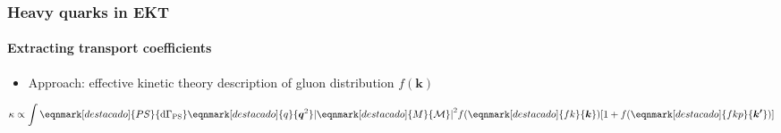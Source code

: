 \documentclass[aspectratio=169,11pt,usenames,dvipsnames]{beamer}
\begin{document}



\begin{frame}
    \frametitle{Heavy quarks in EKT}
    \framesubtitle{Extracting transport coefficients}
        \begin{itemize}
            \item \begin{center}{{\color{ming}Approach}: {\color{ming}effective kinetic theory} description of gluon distribution $f(\boldsymbol{k})$} \end{center}
        \end{itemize} 
        \vspace{1cm}
        \renewcommand{\eqnhighlightheight}{\vphantom{x}}
        \begin{equation*}
            \kappa\propto \int\eqnmark[destacado]{PS}{\mathrm{d}\Gamma_{\mathrm{PS}}} \eqnmark[destacado]{q}{\boldsymbol{q}^2} \abs{\eqnmark[destacado]{M}{\mathcal{M}}}^2f(\eqnmark[destacado]{fk}{\boldsymbol{k}})[1+f(\eqnmark[destacado]{fkp}{\boldsymbol{k}^{\boldsymbol{\prime}}})]
            \end{equation*}
\end{frame}


\end{document}
